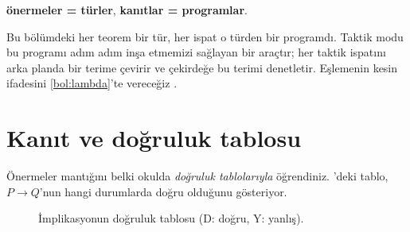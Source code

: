 \begin{onemlifikir}
\begin{center}
\textcolor{leantype}{\bfseries önermeler = türler}, \qquad
\textcolor{leanhyp}{\bfseries kanıtlar = programlar}.
\end{center}
Bu bölümdeki her teorem bir tür, her ispat o türden bir programdı.
Taktik modu bu programı adım adım inşa etmemizi sağlayan bir araçtır;
\Lean{} her taktik ispatını arka planda bir terime çevirir ve çekirdeğe
bu terimi denetletir. Eşlemenin kesin ifadesini \cref{bol:lambda}'te
vereceğiz \citep{howard1980, sorensen2006}.
\end{onemlifikir}

\section{Kanıt ve doğruluk tablosu}\label{sec:dogruluk-tablosu}

Önermeler mantığını belki okulda \emph{doğruluk tablolarıyla}
öğrendiniz. 'deki tablo, $P \to Q$'nun hangi
durumlarda doğru olduğunu gösteriyor.

\begin{figure}[htbp]
\centering
{}
\caption{İmplikasyonun doğruluk tablosu (D: doğru, Y: yanlış).}
\label{fig:dogruluk-tablosu}
\end{figure}

